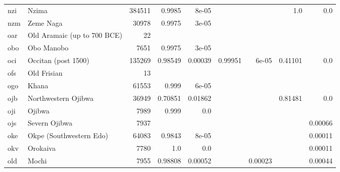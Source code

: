 \documentclass[11pt]{article}
\begin{document}
\begin{table*}[h]
{\begin{tabular}{llrrrrrrr}
nzi         & Nzima         & 384511         & 0.9985         & 8e-05         &          &          & 1.0         & 0.0         \\

nzm         & Zeme Naga         & 30978         & 0.9975         & 3e-05         &          &          &          &          \\

oar         & Old Aramaic (up to 700 BCE)         & 22         &          &          &          &          &          &          \\

obo         & Obo Manobo         & 7651         & 0.9975         & 3e-05         &          &          &          &          \\

oci         & Occitan (post 1500)         & 135269         & 0.98549         & 0.00039         & 0.99951         & 6e-05         & 0.41101         & 0.0         \\

ofs         & Old Frisian         & 13         &          &          &          &          &          &          \\

ogo         & Khana         & 61553         & 0.999         & 6e-05         &          &          &          &          \\

ojb         & Northwestern Ojibwa         & 36949         & 0.70851         & 0.01862         &          &          & 0.81481         & 0.0         \\

oji         & Ojibwa         & 7989         & 0.999         & 0.0         &          &          &          &          \\

ojs         & Severn Ojibwa         & 7937         &          &          &          &          &          & 0.00066         \\

oke         & Okpe (Southwestern Edo)         & 64083         & 0.9843         & 8e-05         &          &          &          & 0.00011         \\

okv         & Orokaiva         & 7780         & 1.0         & 0.0         &          &          &          & 0.00011         \\

old         & Mochi         & 7955         & 0.98808         & 0.00052         &          & 0.00023         &          & 0.00044         \\


\end{tabular}}
\end{table*}
\end{document}
